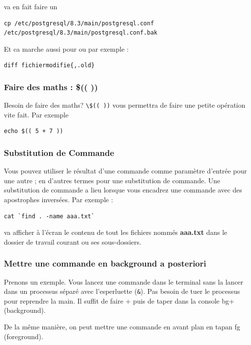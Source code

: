 \documentclass[a4paper,twoside]{article}
\begin{document}
va en fait faire un
\begin{small}\begin{verbatim}
cp /etc/postgresql/8.3/main/postgresql.conf /etc/postgresql/8.3/main/postgresql.conf.bak
\end{verbatim}\end{small}



Et ca marche aussi pour  ou  par exemple :

\begin{verbatim}
diff fichiermodifie{,.old}
\end{verbatim}

\subsubsection{Faire des maths : \$(( ))}
Besoin de faire des maths? \verb|\$(( ))| vous permettra de faire une petite opération vite fait. Par exemple
\begin{verbatim}
echo $(( 5 + 7 ))
\end{verbatim}

\subsubsection{Substitution de Commande}
Vous pouvez utiliser le résultat d'une commande comme paramètre d'entrée pour une autre ; en d'autres termes pour une substitution de commande. Une substitution de commande a lieu lorsque vous encadrez une commande avec des apostrophes inversées. Par exemple :

\begin{verbatim}
cat `find . -name aaa.txt`
\end{verbatim}

va afficher à l'écran le contenu de tout les fichiers nommés \textbf{aaa.txt} dans le dossier de travail courant ou ses sous-dossiers.

\subsubsection{Mettre une commande en background a posteriori}
Prenons un exemple. Vous lancez une commande dans le terminal sans la lancer dans un processus séparé avec l'esperluette (\texttt{\&}). Pas besoin de tuer le processus pour reprendre la main. Il suffit de faire  +  puis de taper dans la console bg+ (background).

De la même manière, on peut mettre une commande en avant plan en tapan fg (foreground).
\end{document}
